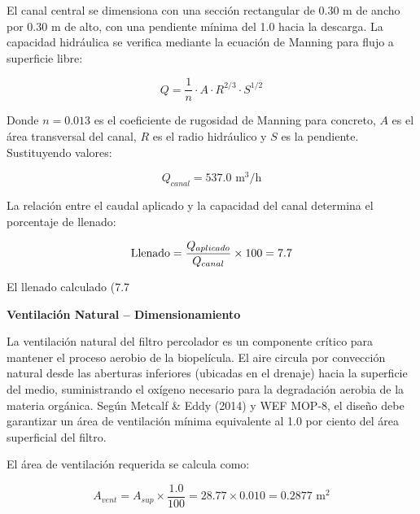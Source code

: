 \documentclass[12pt,a4paper]{article}
\begin{document}
El canal central se dimensiona con una sección rectangular de 0.30 m de ancho por 0.30 m de alto, con una pendiente mínima del 1.0 hacia la descarga. La capacidad hidráulica se verifica mediante la ecuación de Manning para flujo a superficie libre:

\begin{equation}
Q = \frac{1}{n} \cdot A \cdot R^{2/3} \cdot S^{1/2}
\end{equation}

Donde $n = 0.013$ es el coeficiente de rugosidad de Manning para concreto, $A$ es el área transversal del canal, $R$ es el radio hidráulico y $S$ es la pendiente. Sustituyendo valores:

\begin{equation}
Q_{canal} = 537.0 \text{ m}^3\text{/h}
\end{equation}

La relación entre el caudal aplicado y la capacidad del canal determina el porcentaje de llenado:

\begin{equation}
\text{Llenado} = \frac{Q_{aplicado}}{Q_{canal}} \times 100 = 7.7\\%
\end{equation}

El llenado calculado (7.7%

\textbf{Ventilación Natural -- Dimensionamiento}

La ventilación natural del filtro percolador es un componente crítico para mantener el proceso aerobio de la biopelícula. El aire circula por convección natural desde las aberturas inferiores (ubicadas en el drenaje) hacia la superficie del medio, suministrando el oxígeno necesario para la degradación aerobia de la materia orgánica. Según Metcalf \& Eddy (2014) y WEF MOP-8, el diseño debe garantizar un área de ventilación mínima equivalente al 1.0 por ciento del área superficial del filtro.

El área de ventilación requerida se calcula como:

\begin{equation}
A_{vent} = A_{sup} \times \frac{1.0}{100} = 28.77 \times 0.010 = 0.2877 \text{ m}^2
\end{equation}
\end{document}
